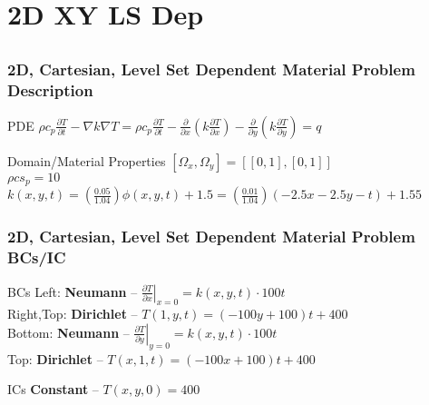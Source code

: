 \documentclass[]{beamer}
\begin{document}
\section{2D XY LS Dep}
\subsection{}
\begin{frame}[t]\frametitle{2D, Cartesian, Level Set Dependent Material Problem Description}
  \begin{block}{PDE}
    $\rho c_p\frac{\partial T}{\partial t} - \nabla k \nabla T = 
    \rho c_p\frac{\partial T}{\partial t} - \frac{\partial}{\partial x}
    \left(k\frac{\partial T}{\partial x}\right) - \frac{\partial}{\partial y}
    \left(k\frac{\partial T}{\partial y}\right)= q$
  \end{block}
  
  \begin{block}{Domain/Material Properties}
  	$[\Omega_x,\Omega_y] = [[0,1],[0,1]]$ \\
  	$\rho cs_p = 10$ \\
  	$k(x,y,t) = \left(\frac{0.05}{1.04} \right)\phi(x,y,t) +1.5 = \left(\frac{0.01}{1.04}\right)
  	(-2.5x - 2.5y - t) + 1.55$
  \end{block}
\end{frame}
  
\begin{frame}[t]\frametitle{2D, Cartesian, Level Set Dependent Material Problem BCs/IC}
  \begin{block}{BCs}
    Left: \textbf{Neumann} -- $\left. \frac{\partial T}{\partial x}\right|_{x=0} =
    k(x,y,t)\cdot 100t$ \\
    Right,Top: \textbf{Dirichlet} -- $T(1,y,t) = (-100y + 100)t +400$ \\
    Bottom: \textbf{Neumann} -- $\left. \frac{\partial T}{\partial y}\right|_{y=0} = 
    k(x,y,t)\cdot 100t$ \\
    Top: \textbf{Dirichlet} -- $T(x,1,t) = (-100x + 100)t + 400$
  \end{block}
  
  \begin{block}{ICs}
    \textbf{Constant} -- $T(x,y,0) = 400$
  \end{block}
\end{frame}
\end{document}
